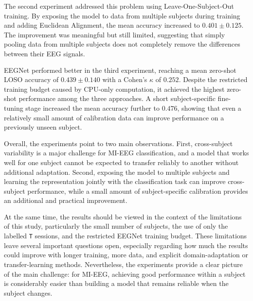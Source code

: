 \documentclass[11pt,a4paper]{article}
\begin{document}
	The second experiment addressed this problem using Leave-One-Subject-Out training. By exposing
	the model to data from multiple subjects during training and adding Euclidean Alignment, the
	mean accuracy increased to $0.401 \pm 0.125$. The improvement was meaningful but still limited,
	suggesting that simply pooling data from multiple subjects does not completely remove the
	differences between their EEG signals.
	
	EEGNet performed better in the third experiment, reaching a mean zero-shot LOSO accuracy of
	$0.439 \pm 0.140$ with a Cohen's $\kappa$ of $0.252$. Despite the restricted training budget
	caused by CPU-only computation, it achieved the highest zero-shot performance among the three
	approaches. A short subject-specific fine-tuning stage increased the mean accuracy further to
	$0.476$, showing that even a relatively small amount of calibration data can improve performance
	on a previously unseen subject.
	
	Overall, the experiments point to two main observations. First, cross-subject variability is a
	major challenge for MI-EEG classification, and a model that works well for one subject cannot be
	expected to transfer reliably to another without additional adaptation. Second, exposing the model
	to multiple subjects and learning the representation jointly with the classification task can
	improve cross-subject performance, while a small amount of subject-specific calibration provides
	an additional and practical improvement.
	
	At the same time, the results should be viewed in the context of the limitations of this study,
	particularly the small number of subjects, the use of only the labelled \texttt{T} sessions, and
	the restricted EEGNet training budget. These limitations leave several important questions open,
	especially regarding how much the results could improve with longer training, more data, and
	explicit domain-adaptation or transfer-learning methods. Nevertheless, the experiments provide a
	clear picture of the main challenge: for MI-EEG, achieving good performance within a subject is
	considerably easier than building a model that remains reliable when the subject changes.
	
\end{document}
